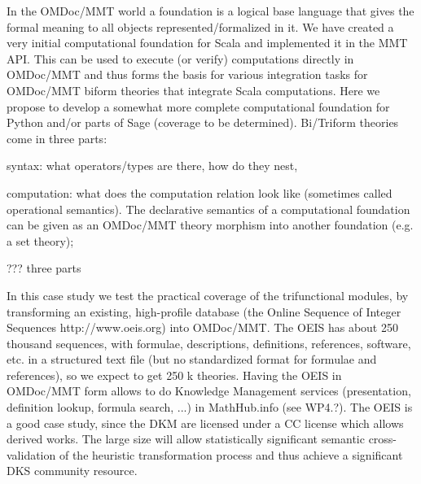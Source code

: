 \begin{workpackage}[id=dksbases,wphases=1-48!.5,
  title=Data/Knowledge/Software-Bases,lead=JU,
  ZHRM=12,JURM=36,USHRM=12,UWRM=3,SARM=9]
\begin{tasklist}
\begin{task}[title=Computational Foundation for Python/Sage (or some CAS),id=data-foundationCAS]
In the OMDoc/MMT world a foundation is a logical base language that gives the formal meaning to all objects represented/formalized in it. We have created a very initial computational foundation for Scala and implemented it in the MMT API. This can be used to execute (or verify) computations directly in OMDoc/MMT and thus forms the basis for various integration tasks for OMDoc/MMT biform theories that integrate Scala computations. Here we propose to develop a somewhat more complete computational foundation for Python and/or parts of Sage (coverage to be determined). Bi/Triform theories come in three parts:
\begin{compactitem}
\item syntax: what operators/types are there, how do they nest, 
\item computation:  what does the computation relation look like (sometimes called operational semantics). The declarative semantics of a computational foundation can be given as an OMDoc/MMT theory morphism into another foundation (e.g. a set theory);
\item ??? three parts
\end{compactitem}
\end{task}

\begin{task}[title=OEIS Case Study (Coverage and automated import),id=data-OEIS]
  In this case study we test the practical coverage of the trifunctional modules, by
  transforming an existing, high-profile database (the Online Sequence of Integer
  Sequences http://www.oeis.org) into OMDoc/MMT. The OEIS has about 250 thousand
  sequences, with formulae, descriptions, definitions, references, software, etc. in a
  structured text file (but no standardized format for formulae and references), so we
  expect to get 250 k theories. Having the OEIS in OMDoc/MMT form allows to do Knowledge
  Management services (presentation, definition lookup, formula search, ...) in
  MathHub.info (see WP4.?). The OEIS is a good case study, since the DKM are licensed
  under a CC license which allows derived works. The large size will allow statistically
  significant semantic cross-validation of the heuristic transformation process and thus
  achieve a significant DKS community resource.
\end{task}



\end{tasklist}
\end{workpackage}
